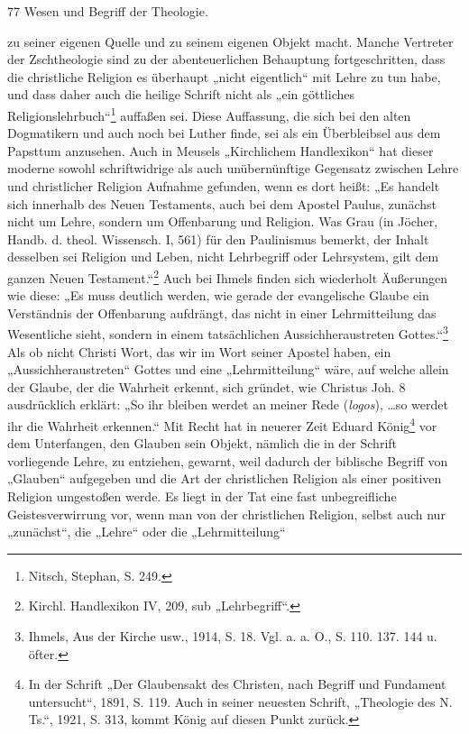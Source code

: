 \begin{center}
  77 \hfill Wesen und Begriff der Theologie.
\end{center}

zu seiner eigenen Quelle und zu seinem eigenen Objekt macht. Manche Vertreter der Zschtheologie sind zu der abenteuerlichen Behauptung fortgeschritten, dass die christliche Religion es überhaupt „nicht eigentlich“ mit Lehre zu tun habe, und dass daher auch die heilige Schrift nicht als „ein göttliches Religionslehrbuch“\footnote{Nitsch, Stephan, S. 249.} auffaßen sei. Diese Auffassung, die sich bei den alten Dogmatikern und auch noch bei Luther finde, sei als ein Überbleibsel aus dem Papsttum anzusehen. Auch in Meusels „Kirchlichem Handlexikon“ hat dieser moderne sowohl schriftwidrige als auch unübernünftige Gegensatz zwischen Lehre und christlicher Religion Aufnahme gefunden, wenn es dort heißt: „Es handelt sich innerhalb des Neuen Testaments, auch bei dem Apostel Paulus, zunächst nicht um Lehre, sondern um Offenbarung und Religion. Was Grau (in Jöcher, Handb. d. theol. Wissensch. I, 561) für den Paulinismus bemerkt, der Inhalt desselben sei Religion und Leben, nicht Lehrbegriff oder Lehrsystem, gilt dem ganzen Neuen Testament.“\footnote{Kirchl. Handlexikon IV, 209, sub „Lehrbegriff“.} Auch bei Ihmels finden sich wiederholt Äußerungen wie diese: „Es muss deutlich werden, wie gerade der evangelische Glaube ein Verständnis der Offenbarung aufdrängt, das nicht in einer Lehrmitteilung das Wesentliche sieht, sondern in einem tatsächlichen Aussichheraustreten Gottes.“\footnote{Ihmels, Aus der Kirche usw., 1914, S. 18. Vgl. a. a. O., S. 110. 137. 144 u. öfter.} Als ob nicht Christi Wort, das wir im Wort seiner Apostel haben, ein „Aussichheraustreten“ Gottes und eine „Lehrmitteilung“ wäre, auf welche allein der Glaube, der die Wahrheit erkennt, sich gründet, wie Christus Joh. 8 ausdrücklich erklärt: „So ihr bleiben werdet an meiner Rede (\emph{logos}), \dots so werdet ihr die Wahrheit erkennen.“ Mit Recht hat in neuerer Zeit Eduard König\footnote{In der Schrift „Der Glaubensakt des Christen, nach Begriff und Fundament untersucht“, 1891, S. 119. Auch in seiner neuesten Schrift, „Theologie des N. Ts.“, 1921, S. 313, kommt König auf diesen Punkt zurück.} vor dem Unterfangen, den Glauben sein Objekt, nämlich die in der Schrift vorliegende Lehre, zu entziehen, gewarnt, weil dadurch der biblische Begriff von „Glauben“ aufgegeben und die Art der christlichen Religion als einer positiven Religion umgestoßen werde. Es liegt in der Tat eine fast unbegreifliche Geistesverwirrung vor, wenn man von der christlichen Religion, selbst auch nur „zunächst“, die „Lehre“ oder die „Lehrmitteilung“